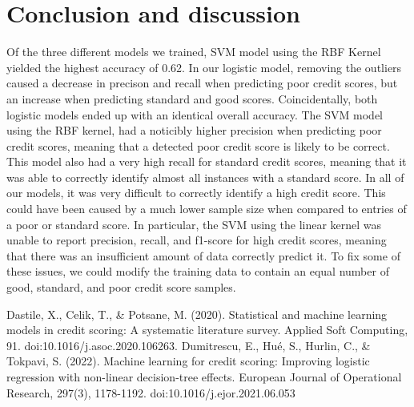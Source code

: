 \documentclass[conference, 11pt]{IEEEtran}
\begin{document}
\section*{Conclusion and discussion}
Of the three different models we trained, SVM model using the RBF Kernel yielded the highest
accuracy of 0.62. In our logistic model, removing the outliers caused a decrease in precison
and recall when predicting poor credit scores, but an increase when predicting standard and good
scores. Coincidentally, both logistic models ended up with an identical overall accuracy.
\vspace{5mm}\newline
The SVM model using the RBF kernel, had a noticibly higher precision when predicting poor credit
scores, meaning that a detected poor credit score is likely to be correct. This model also had a
very high recall for standard credit scores, meaning that it was able to correctly identify almost all
instances with a standard score.
\vspace{5mm}\newline
In all of our models, it was very difficult to correctly identify a high credit score. This could have
been caused by a much lower sample size when compared to entries of a poor or standard score. In particular,
the SVM using the linear kernel was unable to report precision, recall, and f1-score for high credit scores,
meaning that there was an insufficient amount of data correctly predict it. To fix some of these issues,
we could modify the training data to contain an equal number of good, standard, and poor credit score samples. 

\begin{thebibliography}{00}
 Dastile, X., Celik, T., \& Potsane, M. (2020).
Statistical and machine learning models in credit scoring: A systematic literature survey. Applied Soft Computing, 91. doi:10.1016/j.asoc.2020.106263.
 Dumitrescu, E., Hué, S., Hurlin, C., \& Tokpavi, S. (2022). 
Machine learning for credit scoring: Improving logistic regression 
with non-linear decision-tree effects. European Journal of Operational 
Research, 297(3), 1178-1192. doi:10.1016/j.ejor.2021.06.053
\end{thebibliography}
\end{document}

